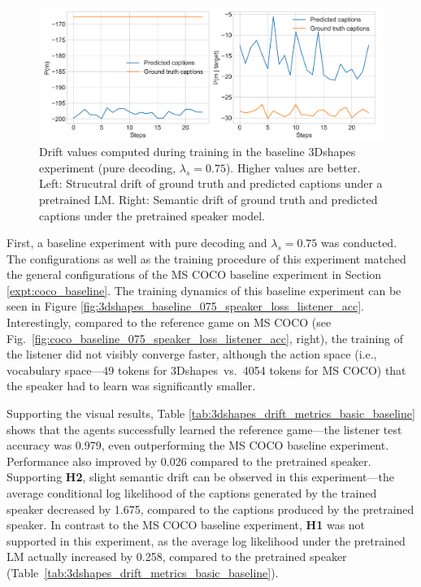 \begin{figure}
	\centering
	\includegraphics[width=\linewidth]{images/3dshapes_structural_semantic_drift_49_pure_075_random.png}
	\caption{Drift values computed during training in the baseline 3Dshapes experiment (pure decoding, $\lambda_s = 0.75$). Higher values are better. Left: Strucutral drift of ground truth and predicted captions under a pretrained LM. Right: Semantic drift of ground truth and predicted captions under the pretrained speaker model.} 
	\label{fig:3dshapes_baseline_075_str_drift}
\end{figure}

First, a baseline experiment with pure decoding and $\lambda_s = 0.75$ was conducted.
The configurations as well as the training procedure of this experiment matched the general configurations of the MS COCO baseline experiment in Section \ref{expt:coco_baseline}. The training dynamics of this baseline experiment can be seen in Figure \ref{fig:3dshapes_baseline_075_speaker_loss_listener_acc}. Interestingly, compared to the reference game on MS COCO (see Fig.~\ref{fig:coco_baseline_075_speaker_loss_listener_acc}, right), the training of the listener did not visibly converge faster, although the action space (i.e., vocabulary space---49 tokens for 3Dshapes~vs.~4054 tokens for MS COCO) that the speaker had to learn was significantly smaller. 
 
Supporting the visual results, Table \ref{tab:3dshapes_drift_metrics_basic_baseline} shows that the agents successfully learned the reference game---the listener test accuracy was 0.979, even outperforming the MS COCO baseline experiment. Performance also improved by 0.026 compared to the pretrained speaker. 
Supporting \textbf{H2}, slight semantic drift can be observed in this experiment---the average conditional log likelihood of the captions generated by the trained speaker decreased by 1.675, compared to the captions produced by the pretrained speaker. In contrast to the MS COCO baseline experiment, \textbf{H1} was not supported in this experiment, as the average log likelihood under the pretrained LM actually increased by 0.258, compared to the pretrained speaker (Table~\ref{tab:3dshapes_drift_metrics_basic_baseline}).
 
